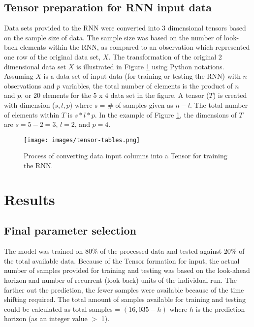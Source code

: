 \subsection{Tensor preparation for RNN input data}
Data sets provided to the RNN were converted into 3 dimensional tensors based on the sample size of data. The sample size was based on the number of look-back elements within the RNN, as compared to an observation which represented one row of the original data set, $X$.  The transformation of the original 2 dimensional data set $X$ is illustrated in Figure \ref{fig:tensor-tables} using Python notations. Assuming $X$ is a data set of input data (for training or testing the RNN) with $n$ observations and $p$ variables, the total number of elements is the product of $n$ and $p$, or 20 elements for the 5 x 4 data set in the figure. A tensor ($T$) is created with dimension ($s, l, p$) where s = \# of samples given as $n - l$. The total number of elements within $T$ is $s*l*p$. In the example of Figure \ref{fig:tensor-tables}, the dimensions of $T$ are $s = 5 - 2 = 3$, $l = 2$, and $p = 4$.    
%
\begin{figure}[H]
\centering
\texttt{[image: images/tensor-tables.png]}
\caption{Process of converting data input columns into a Tensor for training the RNN.}
\label{fig:tensor-tables}
\end{figure}

\section{Results}

\subsection{Final parameter selection}
The model was trained on 80\% of the processed data and tested against 20\% of the total available data. Because of the Tensor formation for input, the actual number of samples provided for training and testing was based on the look-ahead horizon and number of recurrent (look-back) units of the individual run. The farther out the prediction, the fewer samples were available because of the time shifting required. The total amount of samples available for training and testing could be calculated as total samples = $(16,035 - h)$ where $h$ is the prediction horizon (as an integer value $>$ 1). 

